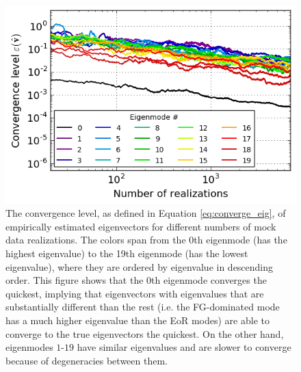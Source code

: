 \documentclass[preprint2,numberedappendix,tighten]{aastex6}  %
\begin{document}
\begin{figure}
	\centering
	\includegraphics[width=\columnwidth]{plots/toy_sigloss17.pdf}
	\caption{The convergence level, as defined in Equation \eqref{eq:converge_eig}, of empirically estimated eigenvectors for different numbers of mock data realizations. The colors span from the 0th eigenmode (has the highest eigenvalue) to the 19th eigenmode (has the lowest eigenvalue), where they are ordered by eigenvalue in descending order. This figure shows that the 0th eigenmode converges the quickest, implying that eigenvectors with eigenvalues that are substantially different than the rest (i.e. the FG-dominated mode has a much higher eigenvalue than the EoR modes) are able to converge to the true eigenvectors the quickest. On the other hand, eigenmodes $1$-$19$ have similar eigenvalues and are slower to converge because of degeneracies between them.}
	\label{fig:toy_sigloss17}
\end{figure}
\end{document}
